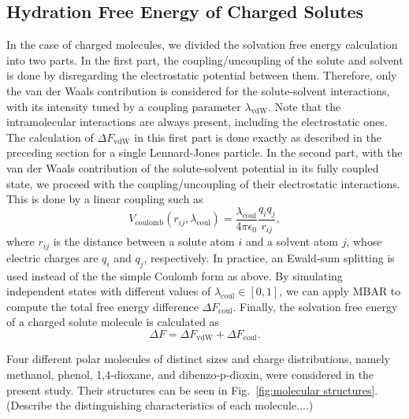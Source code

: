 \documentclass[
aip,
jcp,
reprint,
]{revtex4-1}
\begin{document}
\subsection{Hydration Free Energy of Charged Solutes}

In the case of charged molecules, we divided the solvation free energy calculation into two parts.
In the first part, the coupling/uncoupling of the solute and solvent is done by disregarding the electrostatic potential between them.
Therefore, only the van der Waals contribution is considered for the solute-solvent interactions, with its intensity tuned by a coupling parameter $\lambda_\mathrm{vdW}$.
Note that the intramolecular interactions are always present, including the electrostatic ones.
The calculation of $\Delta F_\mathrm{vdW}$ in this first part is done exactly as described in the preceding section for a single Lennard-Jones particle.
In the second part, with the van der Waals contribution of the solute-solvent potential in its fully coupled state, we proceed with the coupling/uncoupling of their electrostatic interactions.
This is done by a linear coupling such as
\begin{equation*}
V_\mathrm{coulomb}(r_{ij},\lambda_\mathrm{coul}) = \frac{\lambda_\mathrm{coul}}{4 \pi \epsilon_0} \frac{q_i q_j}{r_{ij}},
\end{equation*}
where $r_{ij}$ is the distance between a solute atom $i$ and a solvent atom $j$, whose electric charges are $q_i$ and $q_j$, respectively.
In practice, an Ewald-sum splitting is used instead of the the simple Coulomb form as above.
By simulating independent states with different values of $\lambda_\mathrm{coul} \in [0, 1]$, we can apply MBAR to compute the total free energy difference $\Delta F_\mathrm{coul}$.
Finally, the solvation free energy of a charged solute molecule is calculated as
\begin{equation}
\Delta F = \Delta F_\mathrm{vdW} + \Delta F_\mathrm{coul}.
\end{equation}

Four different polar molecules of distinct sizes and charge distributions, namely methanol, phenol, 1,4-dioxane, and dibenzo-p-dioxin, were considered in the present study.
Their structures can be seen in Fig.~\ref{fig:molecular structures}.
(Describe the distinguishing characteristics of each molecule....)
\end{document}
